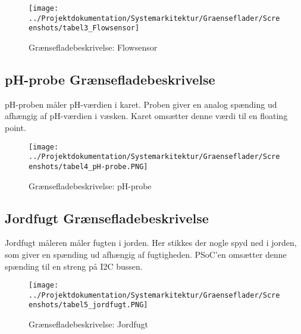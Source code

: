 \begin{figure}[H]
	\centering
	\texttt{[image: ../Projektdokumentation/Systemarkitektur/Graenseflader/Screenshots/tabel3\_Flowsensor]}
	\caption{Grænsefladebeskrivelse: Flowsensor}
	\label{screenshot:tabel3}
\end{figure}

\subsection{pH-probe Grænsefladebeskrivelse}
pH-proben måler pH-værdien i karet. Proben giver en analog spænding ud afhængig af pH-værdien i væsken. Karet omsætter denne værdi til en floating point. 

\begin{figure}[H]
	\centering
	\texttt{[image: ../Projektdokumentation/Systemarkitektur/Graenseflader/Screenshots/tabel4\_pH-probe.PNG]}
	\caption{Grænsefladebeskrivelse: pH-probe}
	\label{screenshot:tabel4}
\end{figure}

\subsection{Jordfugt Grænsefladebeskrivelse}
Jordfugt måleren måler fugten i jorden. Her stikkes der nogle spyd ned i jorden, som giver en spænding ud afhængig af fugtigheden. PSoC'en omsætter denne spænding til en streng på I2C bussen.

\begin{figure}[H]
	\centering
	\texttt{[image: ../Projektdokumentation/Systemarkitektur/Graenseflader/Screenshots/tabel5\_jordfugt.PNG]}
	\caption{Grænsefladebeskrivelse: Jordfugt}
	\label{screenshot:tabel5}
\end{figure}

